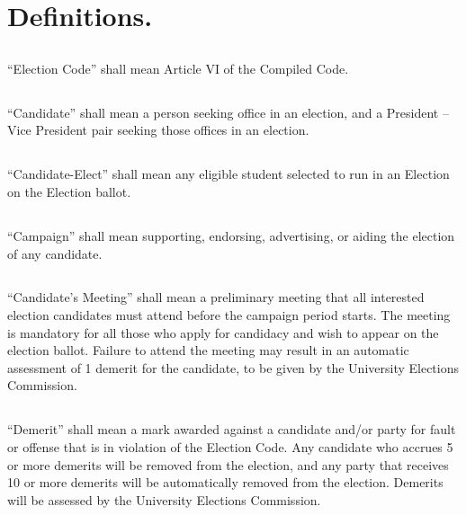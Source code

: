 
\section{Definitions.}

\subsection{}
``Election Code'' shall mean Article VI of the Compiled Code.

\subsection{}
``Candidate'' shall mean a person seeking office in an election, and a President -- Vice President pair seeking those offices in an election.

\subsection{}
``Candidate-Elect'' shall mean any eligible student selected to run in an Election on the Election ballot.

\subsection{}
``Campaign'' shall mean supporting, endorsing, advertising, or aiding the election of any candidate.

\subsection{}
``Candidate's Meeting'' shall mean a preliminary meeting that all interested election candidates must attend before the campaign period starts. The meeting is mandatory for all those who apply for candidacy and wish to appear on the election ballot. Failure to attend the meeting may result in an automatic assessment of 1 demerit for the candidate, to be given by the University Elections Commission.

\subsection{}
``Demerit'' shall mean a mark awarded against a candidate and/or party for fault or offense that is in violation of the Election Code. Any candidate who accrues 5 or more demerits will be removed from the election, and any party that receives 10 or more demerits will be automatically removed from the election. Demerits will be assessed by the University Elections Commission.

